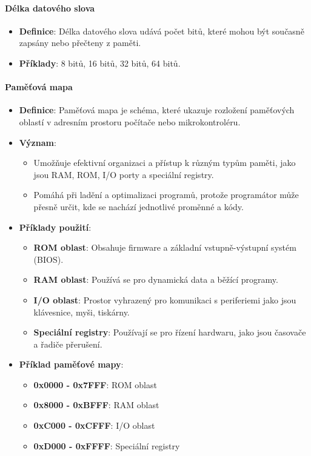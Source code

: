 \paragraph{Délka datového slova}
\begin{itemize}
    \item \textbf{Definice}: Délka datového slova udává počet bitů, které mohou být současně zapsány nebo přečteny z paměti.
    \item \textbf{Příklady}: 8 bitů, 16 bitů, 32 bitů, 64 bitů.
\end{itemize}

\paragraph{Paměťová mapa}
\begin{itemize}
    \item \textbf{Definice}: Paměťová mapa je schéma, které ukazuje rozložení paměťových oblastí v adresním prostoru počítače nebo mikrokontroléru.
    \item \textbf{Význam}: 
    \begin{itemize}
        \item Umožňuje efektivní organizaci a přístup k různým typům paměti, jako jsou RAM, ROM, I/O porty a speciální registry.
        \item Pomáhá při ladění a optimalizaci programů, protože programátor může přesně určit, kde se nachází jednotlivé proměnné a kódy.
    \end{itemize}
    \item \textbf{Příklady použití}:
    \begin{itemize}
        \item \textbf{ROM oblast}: Obsahuje firmware a základní vstupně-výstupní systém (BIOS).
        \item \textbf{RAM oblast}: Používá se pro dynamická data a běžící programy.
        \item \textbf{I/O oblast}: Prostor vyhrazený pro komunikaci s periferiemi jako jsou klávesnice, myši, tiskárny.
        \item \textbf{Speciální registry}: Používají se pro řízení hardwaru, jako jsou časovače a řadiče přerušení.
    \end{itemize}
    \item \textbf{Příklad paměťové mapy}:
    \begin{itemize}
        \item \textbf{0x0000 - 0x7FFF}: ROM oblast
        \item \textbf{0x8000 - 0xBFFF}: RAM oblast
        \item \textbf{0xC000 - 0xCFFF}: I/O oblast
        \item \textbf{0xD000 - 0xFFFF}: Speciální registry
    \end{itemize}
\end{itemize}
